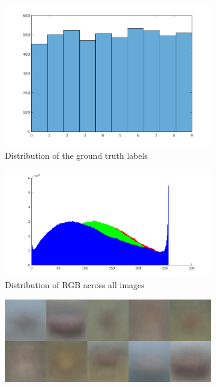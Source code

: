 \documentclass{article} %
\begin{document}
    \begin{figure}[h]
        \centering
        \begin{subfigure}{.2\linewidth}
            \centering
            \includegraphics[width=.75\linewidth]{images/label-distribution.png}
        \caption{Distribution of the ground truth labels}
        \end{subfigure}
        \begin{subfigure}{.2\linewidth}
            \centering
            \includegraphics[width=\linewidth]{images/hist-overall.png}
        \caption{Distribution of RGB across all images}
        \end{subfigure}
        \begin{subfigure}{.2\linewidth}
            \centering
            \includegraphics[width=\linewidth]{images/avg-img.png}

\end{subfigure}
\end{figure}
\end{document}
